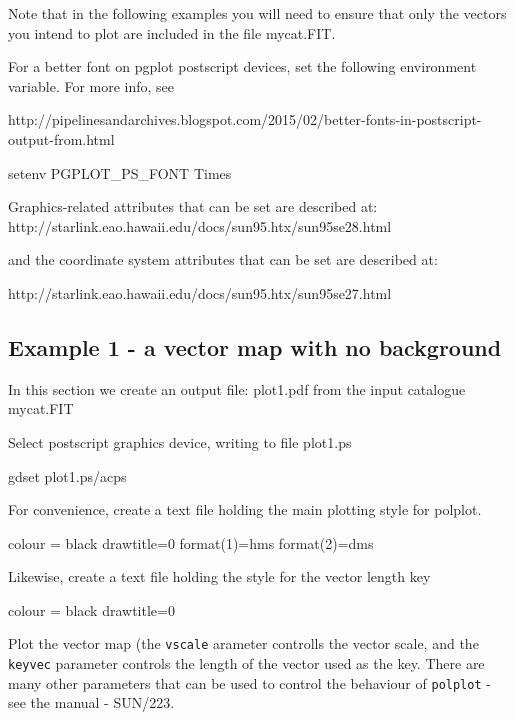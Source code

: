 Note that in the following examples you will need to ensure that only the
vectors you intend to plot are included in the file mycat.FIT.

\begin{tip}
For a better font on pgplot postscript devices, set the
following environment variable. For more info, see

http://pipelinesandarchives.blogspot.com/2015/02/better-fonts-in-postscript-output-from.html

\begin{terminalv}
setenv PGPLOT_PS_FONT Times
\end{terminalv}

Graphics-related attributes that can be set are described at:
http://starlink.eao.hawaii.edu/docs/sun95.htx/sun95se28.html

and the coordinate system attributes that can be set are
described at:

http://starlink.eao.hawaii.edu/docs/sun95.htx/sun95se27.html
\end{tip}



\subsection{ Example 1 - a vector map with no background}
\label{section:kappa-example1}

In this section we create an output file: plot1.pdf from the input catalogue mycat.FIT

Select postscript graphics device, writing to file plot1.ps

\begin{terminalv}
gdset plot1.ps/acps
\end{terminalv}

For convenience, create a text file holding the main plotting style for polplot.

\begin{terminalv}
colour = black
drawtitle=0
format(1)=hms
format(2)=dms
\end{terminalv}

Likewise, create a text file holding the style for the vector length key

\begin{terminalv}
colour = black
drawtitle=0
\end{terminalv}


Plot the vector map (the \texttt{vscale} arameter controlls the vector
scale, and the \texttt{keyvec} parameter controls the length of the
vector used as the key. There are many other parameters that can be used
to control the behaviour of \texttt{polplot} - see the \polpack manual - SUN/223.

